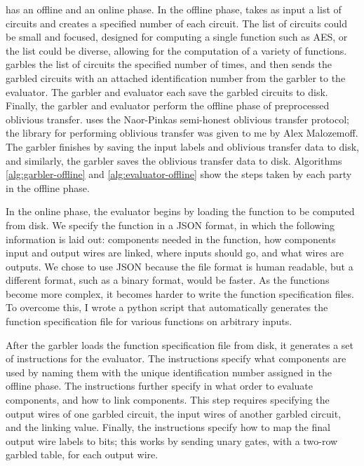 \CompGC has an offline and an online phase. 
In the offline phase, \CompGC takes as input a list of circuits and creates a specified number of each circuit. 
The list of circuits could be small and focused, designed for computing a single function such as AES, or the list could be diverse, allowing for the computation of a variety of functions. 
\CompGC garbles the list of circuits the specified number of times, and then sends the garbled circuits with an attached identification number from the garbler to the evaluator. 
The garbler and evaluator each save the garbled circuits to disk. 
Finally, the garbler and evaluator perform the offline phase of preprocessed oblivious transfer. 
\CompGC uses the Naor-Pinkas semi-honest oblivious transfer protocol; the library for performing oblivious transfer was given to me by Alex Malozemoff. 
The garbler finishes by saving the input labels and oblivious transfer data to disk, and similarly, the garbler saves the oblivious transfer data to disk. 
Algorithms \ref{alg:garbler-offline} and \ref{alg:evaluator-offline} show the steps taken by each party in the offline phase. 

In the online phase, the evaluator begins by loading the function to be computed from disk. 
We specify the function in a JSON format, in which the following information is laid out: components needed in the function, how components input and output wires are linked, where inputs should go, and what wires are outputs. 
We chose to use JSON because the file format is human readable, but a different format, such as a binary format, would be faster. 
As the functions become more complex, it becomes harder to write the function specification files. 
To overcome this, I wrote a python script that automatically generates the function specification file for various functions on arbitrary inputs. 

After the garbler loads the function specification file from disk, it generates a set of instructions for the evaluator. 
The instructions specify what components are used by naming them with the unique identification number assigned in the offline phase. 
The instructions further specify in what order to evaluate components, and how to link components. 
This step requires specifying the output wires of one garbled circuit, the input wires of another garbled circuit, and the linking value.
Finally, the instructions specify how to map the final output wire labels to bits; this works by sending unary gates, with a two-row garbled table, for each output wire. 

